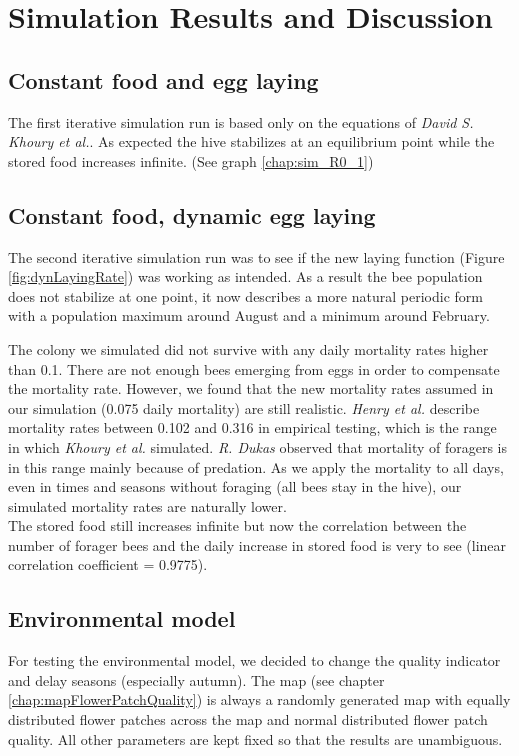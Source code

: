 \section{Simulation Results and Discussion}

\subsection{Constant food and egg laying}
	\label{chap:constantFoodConstantLaying}
	The first iterative simulation run is based only on the equations of \textit{David S. Khoury et al.}\cite{khoury13}. As expected the hive stabilizes at an equilibrium point while the stored food increases infinite. (See graph \ref{chap:sim_R0_1})

\subsection{Constant food, dynamic egg laying}
	\label{chap:constantFoodDynamicLaying}
	The second iterative simulation run was to see if the new laying function (Figure \ref{fig:dynLayingRate})  was working as intended. As a result the bee population does not stabilize at one point, it now describes a more natural periodic form with a population maximum around August and a minimum around February.
	
	The colony we simulated did not survive with any daily mortality rates higher than 0.1. There are not enough bees emerging from eggs in order to compensate the mortality rate. However, we found that the new mortality rates assumed in our simulation (0.075 daily mortality) are still realistic. \textit{Henry et al.} \cite{henry12} describe mortality rates between 0.102 and 0.316 in empirical testing, which is the range in which \textit{Khoury et al.} \cite{khoury13} simulated. \textit{R. Dukas} \cite{dukas08} observed that mortality of foragers is in this range mainly because of predation. As we apply the mortality to all days, even in times and seasons without foraging (all bees stay in the hive), our simulated mortality rates are naturally lower.\\
	
	The stored food still increases infinite but now the correlation between the number of forager bees and the daily increase in stored food is very to see (linear correlation coefficient =  0.9775).

\subsection{Environmental model}
	\label{chap:environmentalModelDiscussion}
	For testing the environmental model, we decided to change the quality indicator and delay seasons (especially autumn). The map (see chapter \ref{chap:mapFlowerPatchQuality}) is always a randomly generated map with equally distributed flower patches across the map and normal distributed flower patch quality. All other parameters are kept fixed so that the results are unambiguous.
